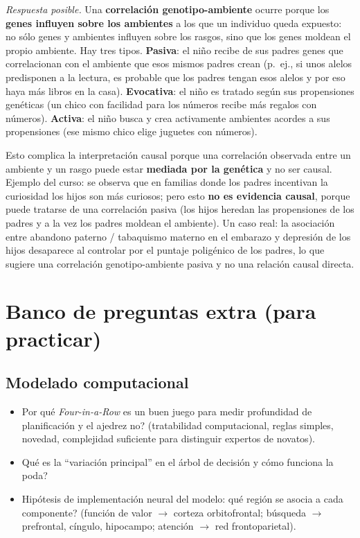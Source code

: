 \documentclass[11pt, a4paper]{article}
\begin{document}
\begin{respuesta}
\textit{Respuesta posible.} Una \textbf{correlaci\'on genotipo-ambiente} ocurre porque los \textbf{genes influyen sobre los ambientes} a los que un individuo queda expuesto: no s\'olo genes y ambientes influyen sobre los rasgos, sino que los genes moldean el propio ambiente. Hay tres tipos. \textbf{Pasiva}: el ni\~no recibe de sus padres genes que correlacionan con el ambiente que esos mismos padres crean (p.\ ej., si unos alelos predisponen a la lectura, es probable que los padres tengan esos alelos y por eso haya m\'as libros en la casa). \textbf{Evocativa}: el ni\~no es tratado seg\'un sus propensiones gen\'eticas (un chico con facilidad para los n\'umeros recibe m\'as regalos con n\'umeros). \textbf{Activa}: el ni\~no busca y crea activamente ambientes acordes a sus propensiones (ese mismo chico elige juguetes con n\'umeros).

Esto complica la interpretaci\'on causal porque una correlaci\'on observada entre un ambiente y un rasgo puede estar \textbf{mediada por la gen\'etica} y no ser causal. Ejemplo del curso: se observa que en familias donde los padres incentivan la curiosidad los hijos son m\'as curiosos; pero esto \textbf{no es evidencia causal}, porque puede tratarse de una correlaci\'on pasiva (los hijos heredan las propensiones de los padres y a la vez los padres moldean el ambiente). Un caso real: la asociaci\'on entre abandono paterno / tabaquismo materno en el embarazo y depresi\'on de los hijos desaparece al controlar por el puntaje polig\'enico de los padres, lo que sugiere una correlaci\'on genotipo-ambiente pasiva y no una relaci\'on causal directa.
\end{respuesta}

\section*{Banco de preguntas extra (para practicar)}

\subsection*{Modelado computacional}
\begin{itemize}[nosep]
    \item \textquestiondown Por qu\'e \textit{Four-in-a-Row} es un buen juego para medir profundidad de planificaci\'on y el ajedrez no? (tratabilidad computacional, reglas simples, novedad, complejidad suficiente para distinguir expertos de novatos).
    \item \textquestiondown Qu\'e es la ``variaci\'on principal'' en el \'arbol de decisi\'on y c\'omo funciona la poda?
    \item Hip\'otesis de implementaci\'on neural del modelo: \textquestiondown qu\'e regi\'on se asocia a cada componente? (funci\'on de valor $\to$ corteza orbitofrontal; b\'usqueda $\to$ prefrontal, c\'ingulo, hipocampo; atenci\'on $\to$ red frontoparietal).
\end{itemize}
\end{document}
